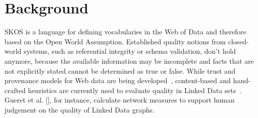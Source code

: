 
\section{Background}


SKOS is a language for defining vocabularies in the Web of Data and therefore based on the Open World Assumption. Established quality notions from closed-world systems, such as referential integrity or schema validation, don't hold anymore, because the available information may be incomplete and facts that are not explicitly stated cannot be determined as true or false. While trust and provenance models for Web data are being developed~\cite{Omitola2011,Hartig2009}, content-based and hand-crafted heuristics are currently used to evaluate quality in Linked Data sets~\cite{Heath2011}. Gueret et al. [], for instance, calculate network measures to support human judgement on the quality of Linked Data  graphs.




